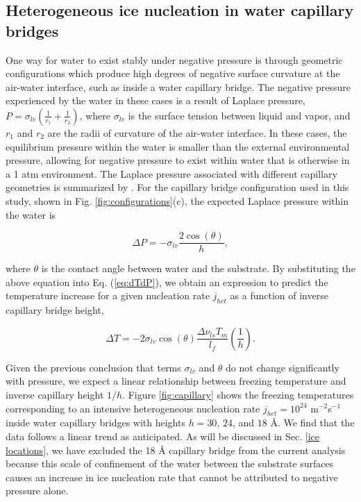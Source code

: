 \documentclass[journal abbreviation, manuscript]{copernicus}
\begin{document}
\subsection{Heterogeneous ice nucleation in water capillary bridges} \label{capillary}

One way for water to exist stably under negative pressure is through geometric configurations which produce high degrees of negative surface curvature at the air-water interface, such as inside a water capillary bridge. The negative pressure experienced by the water in these cases is a result of Laplace pressure, $P = \sigma_{lv}(\frac{1}{r_1}+\frac{1}{r_2})$, where $\sigma_{lv}$ is the surface tension between liquid and vapor, and $r_1$ and $r_2$ are the radii of curvature of the air-water interface. In these cases, the equilibrium pressure within the water is smaller than the external environmental pressure, allowing for negative pressure to exist within water that is otherwise in a 1 atm environment. The Laplace pressure associated with different capillary geometries is summarized by \citet{elliott2021}. For the capillary bridge configuration used in this study, shown in Fig. \ref{fig:configurations}(c), the expected Laplace pressure within the water is

\begin{equation} \label{eq:dPh}
   \Delta P = -\sigma_{lv} \frac{2\cos(\theta)}{h},
\end{equation}

\noindent where $\theta$ is the contact angle between water and the substrate. By substituting the above equation into Eq. (\ref{eq:dTdP}), we obtain an expression to predict the temperature increase for a given nucleation rate $j_{het}$ as a function of inverse capillary bridge height,  

\begin{equation}\label{eq:dTh}
     \Delta T = -2 \sigma_{lv}\cos(\theta) \frac{\Delta \nu_{ls} T_m }{l_f} \left(\frac{1}{h}\right).
\end{equation}

\noindent Given the previous conclusion that terms $\sigma_{lv}$ and $\theta$ do not change significantly with pressure, we expect a linear relationship between freezing temperature and inverse capillary height $1/h$. Figure \ref{fig:capillary} shows the freezing temperatures corresponding to an intensive heterogeneous nucleation rate $j_{het} = 10^{24}$ m$^{-2}$s$^{-1}$ inside water capillary bridges with heights $h = 30$, $24$, and $18$ \AA{}. We find that the data follows a linear trend as anticipated. As will be discussed in Sec. \ref{ice locations}, we have excluded the 18 \AA{} capillary bridge from the current analysis because this scale of confinement of the water between the substrate surfaces causes an increase in ice nucleation rate that cannot be attributed to negative pressure alone.
\end{document}
